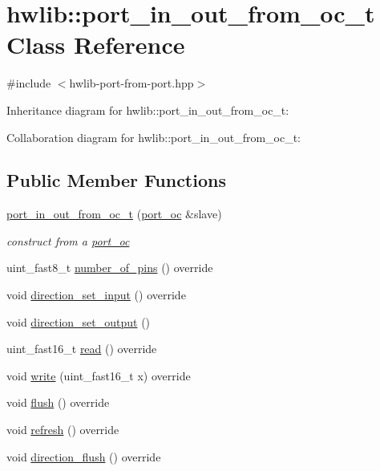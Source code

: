 \hypertarget{classhwlib_1_1port__in__out__from__oc__t}{}\section{hwlib\+:\+:port\+\_\+in\+\_\+out\+\_\+from\+\_\+oc\+\_\+t Class Reference}
\label{classhwlib_1_1port__in__out__from__oc__t}


{\ttfamily \#include $<$hwlib-\/port-\/from-\/port.\+hpp$>$}



Inheritance diagram for hwlib\+:\+:port\+\_\+in\+\_\+out\+\_\+from\+\_\+oc\+\_\+t\+:


Collaboration diagram for hwlib\+:\+:port\+\_\+in\+\_\+out\+\_\+from\+\_\+oc\+\_\+t\+:
\subsection*{Public Member Functions}
\begin{DoxyCompactItemize}
\item 
\mbox{\label{classhwlib_1_1port__in__out__from__oc__t_a2ccf2c49f56b38886e926007a859f9ab}} 
\hyperlink{classhwlib_1_1port__in__out__from__oc__t_a2ccf2c49f56b38886e926007a859f9ab}{port\+\_\+in\+\_\+out\+\_\+from\+\_\+oc\+\_\+t} (\hyperlink{classhwlib_1_1port__oc}{port\+\_\+oc} \&slave)
\begin{DoxyCompactList}\small\item\em construct from a \hyperlink{classhwlib_1_1port__oc}{port\+\_\+oc} \end{DoxyCompactList}\item 
uint\+\_\+fast8\+\_\+t \hyperlink{classhwlib_1_1port__in__out__from__oc__t_a0dda97b4a90f2f63ed7c95f5b45f4d37}{number\+\_\+of\+\_\+pins} () override
\item 
void \hyperlink{classhwlib_1_1port__in__out__from__oc__t_a701fe36cf6d03151ede1382c0ee054c5}{direction\+\_\+set\+\_\+input} () override
\item 
void \hyperlink{classhwlib_1_1port__in__out__from__oc__t_ab4cd56460a6627c3fc7f39cb2e78a9c8}{direction\+\_\+set\+\_\+output} ()
\item 
uint\+\_\+fast16\+\_\+t \hyperlink{classhwlib_1_1port__in__out__from__oc__t_a9d57f7d3ee2ef22d16d6c47ec914c0fd}{read} () override
\item 
void \hyperlink{classhwlib_1_1port__in__out__from__oc__t_a47f3cada1694544f728d33f85918a806}{write} (uint\+\_\+fast16\+\_\+t x) override
\item 
void \hyperlink{classhwlib_1_1port__in__out__from__oc__t_aed77890fb29c1b3e5991786e8bd419d5}{flush} () override
\item 
void \hyperlink{classhwlib_1_1port__in__out__from__oc__t_a18b040a25923ba0189c5689e2dedb233}{refresh} () override
\item 
void \hyperlink{classhwlib_1_1port__in__out__from__oc__t_aa8d8a3394669a8899d4e02f678722c3f}{direction\+\_\+flush} () override
\end{DoxyCompactItemize}


